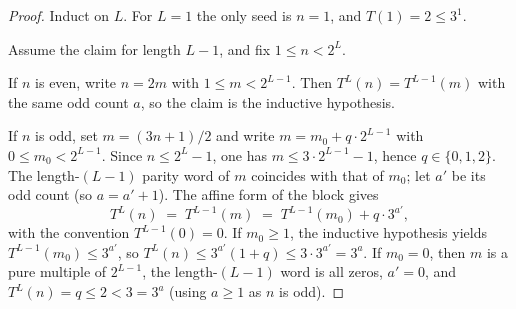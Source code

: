 \documentclass[11pt]{amsart}
\theoremstyle{definition}
\theoremstyle{remark}
\begin{document}
\begin{proof}
Induct on $L$. For $L=1$ the only seed is $n=1$, and $T(1)=2\le 3^{1}$.

Assume the claim for length $L-1$, and fix $1\le n<2^{L}$.

If $n$ is even, write $n=2m$ with $1\le m<2^{L-1}$. Then $T^{L}(n)=T^{L-1}(m)$ with the same odd count $a$, so the claim is the inductive hypothesis.

If $n$ is odd, set $m=(3n+1)/2$ and write $m=m_{0}+q\cdot 2^{L-1}$ with $0\le m_{0}<2^{L-1}$. Since $n\le 2^{L}-1$, one has $m\le 3\cdot 2^{L-1}-1$, hence $q\in\{0,1,2\}$. The length-$(L-1)$ parity word of $m$ coincides with that of $m_{0}$; let $a'$ be its odd count (so $a=a'+1$). The affine form of the block gives
\[
T^{L}(n) \;=\; T^{L-1}(m) \;=\; T^{L-1}(m_{0}) + q\cdot 3^{a'},
\]
with the convention $T^{L-1}(0)=0$. If $m_{0}\ge 1$, the inductive hypothesis yields $T^{L-1}(m_{0})\le 3^{a'}$, so $T^{L}(n)\le 3^{a'}(1+q)\le 3\cdot 3^{a'}=3^{a}$. If $m_{0}=0$, then $m$ is a pure multiple of $2^{L-1}$, the length-$(L-1)$ word is all zeros, $a'=0$, and $T^{L}(n)=q\le 2<3=3^{a}$ (using $a\ge 1$ as $n$ is odd).
\end{proof}
\end{document}

